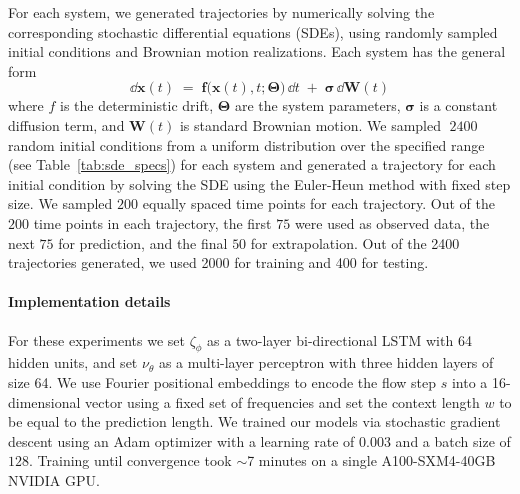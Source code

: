 \documentclass[preprint,12pt,authoryear]{elsarticle}
\begin{document}
For each system, we generated trajectories by numerically solving the corresponding stochastic differential equations (SDEs), using randomly sampled initial conditions and Brownian motion realizations.
Each system has the general form
$$
  \dd \mathbf{x}(t) \;=\; \mathbf{f}\bigl(\mathbf{x}(t),t;\boldsymbol{\Theta}\bigr)\,\dd t 
  \;+\; \boldsymbol{\sigma}\,\dd \mathbf{W}(t)
$$
where \(f\) is the deterministic drift, \(\boldsymbol{\Theta}\) are the system parameters, \(\boldsymbol{\sigma}\) is a constant diffusion term, and \(\mathbf{W}(t)\) is standard Brownian motion.
We sampled \(\;2400\) random initial conditions from a uniform distribution over the specified range (see Table~\ref{tab:sde_specs}) for each system and generated a trajectory for each initial condition by solving the SDE using the Euler-Heun method with fixed step size.  We sampled \(200\) equally spaced time points for each trajectory. Out of the \(200\) time points in each trajectory, the first \(75\) were used as observed data, the next \(75\) for prediction, and the final \(50\) for extrapolation. Out of the 2400 trajectories generated, we used 2000 for training and 400 for testing.



\paragraph{Implementation details} For these experiments we set $\zeta_\phi$ as a two-layer bi-directional LSTM with 64 hidden units, and set $\nu_{\theta}$ as a multi-layer perceptron with three hidden layers of size 64. We use Fourier positional embeddings to encode the flow step $s$ into a 16-dimensional vector using a fixed set of frequencies and set the context length $w$ to be equal to the prediction length. We trained our models via stochastic gradient descent using an Adam optimizer with a learning rate of $0.003$ and a batch size of $128$. Training until convergence took $\sim$7 minutes on a single A100-SXM4-40GB NVIDIA GPU. 
\end{document}
